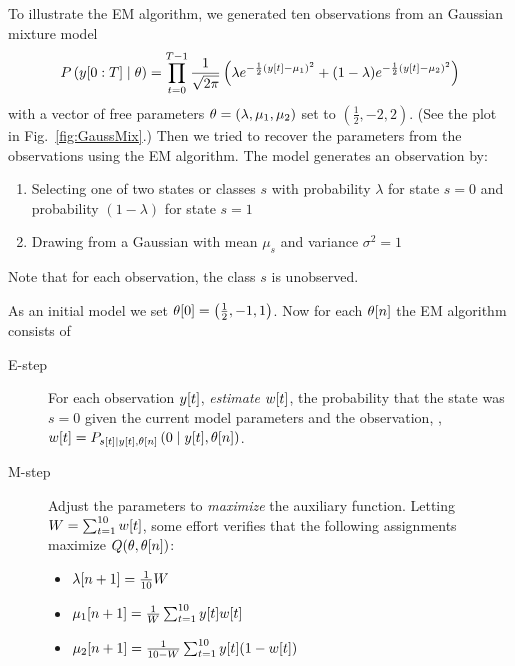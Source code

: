 To illustrate the EM algorithm, we generated ten observations from an
\iid Gaussian mixture model 
\begin{equation}
  \label{eq:GaussMix}
  P\left(y[0:T]\mid \theta \right) = \prod_{t=0}^{T-1}
  \frac{1}{\sqrt{2\pi}} \left( \lambda e^{-\frac{1}{2}
  ({y}{[t]}-\mu_1)^2} +
  (1-\lambda) e^{-\frac{1}{2} ({y}{[t]}-\mu_2)^2 } \right)
\end{equation}
with a vector of free parameters $\theta = (\lambda,\mu_1,\mu_2)$ set
to $(\frac{1}{2},-2,2)$.  (See the plot in Fig.~\ref{fig:GaussMix}.)
Then we tried to recover the parameters from the observations using
the EM algorithm.  The model generates an observation by:
\begin{enumerate}
\item Selecting one of two states or classes $s$ with probability
  $\lambda$ for state $s=0$ and probability $(1-\lambda)$ for state $s=1$
\item Drawing from a Gaussian with mean $\mu_s$ and variance $\sigma^2
  = 1$
\end{enumerate}
Note that for each observation, the class $s$ is unobserved.

As an initial model we set ${\theta}{[0]} = \left( \frac{1}{2}, -1, 1
\right)$.  Now for each ${\theta}{[n]}$ the EM algorithm consists of
\begin{description}
\item[E-step] For each observation ${y}{[t]}$, \emph{estimate}
  ${w}{[t]}$, the probability that the state was $s=0$ given the
  current model parameters and the observation, \ie, ${w}{[t]} =
  P_{{s}{[t]}\mid {y}{[t]},{\theta}{[n]}} \left(0\mid {y}{[t]},
    {\theta}{[n]}\right)$.
\item[M-step] Adjust the parameters to \emph{maximize} the auxiliary
  function.  Letting $W = \sum_{t=1}^{10} {w}{[t]}$, some effort
  verifies that the following assignments maximize
  $Q(\theta,{\theta}{[n]})$:
  \begin{itemize}
  \item ${\lambda}{[n+1]} = \frac{1}{10} W$
  \item ${\mu_1}{[n+1]} = \frac{1}{W}\sum_{t=1}^{10} {y}{[t]} {w}{[t]}$
  \item ${\mu_2}{[n+1]} = \frac{1}{10-W}\sum_{t=1}^{10} {y}{[t]} (1-{w}{[t]})$
  \end{itemize}
\end{description}

